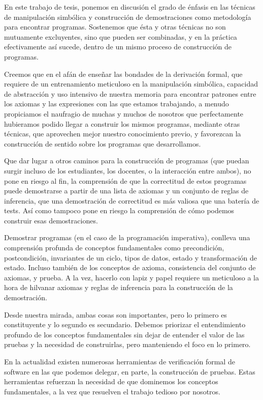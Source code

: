 \documentclass[12pt, a4paper, openany, fleqn]{book}
\begin{document}
    En este trabajo de tesis, ponemos en discusión el grado de énfasis en las técnicas de manipulación simbólica y construcción de demostraciones como metodología para encontrar programas. Sostenemos que ésta y otras técnicas no son mutuamente excluyentes, sino que pueden ser combinadas, y en la práctica efectivamente así sucede, dentro de un mismo proceso de construcción de programas.

    Creemos que en el afán de enseñar las bondades de la derivación formal, que requiere de un entrenamiento meticuloso en la manipulación simbólica, capacidad de abstracción y uso intensivo de nuestra memoria para encontrar patrones entre los axiomas y las expresiones con las que estamos trabajando, a menudo propiciamos el naufragio de muchas y muchos de nosotros que perfectamente hubieramos podido llegar a construir los mismos programas, mediante otras técnicas, que aprovechen mejor nuestro conocimiento previo, y favorezcan la construcción de sentido sobre los programas que desarrollamos.

    Que dar lugar a otros caminos para la construcción de programas (que puedan surgir incluso de los estudiantes, los docentes, o la interacción entre ambos), no pone en riesgo al fin, la comprensión de que la correctitud de estos programas puede demostrarse a partir de una lista de axiomas y un conjunto de reglas de inferencia, que una demostración de correctitud es más valiosa que una batería de tests. Así como tampoco pone en riesgo la comprensión de cómo podemos construir esas demostraciones.

    Demostrar programas (en el caso de la programación imperativa), conlleva una comprensión profunda de conceptos fundamentales como precondición, postcondición, invariantes de un ciclo, tipos de datos, estado y transformación de estado. Incluso también de los conceptos de axioma, consistencia del conjunto de axiomas, y prueba.
    A la vez, hacerlo con lapiz y papel requiere un meticuloso a la hora de hilvanar axiomas y reglas de inferencia para la construcción de la demostración.

    Desde nuestra mirada, ambas cosas son importantes, pero lo primero es constituyente y lo segundo es secundario. Debemos priorizar el entendimiento profundo de los conceptos fundamentales sin dejar de entender el valor de las pruebas y la necesidad de construirlas, pero manteniendo el foco en lo primero.

    En la actualidad existen numerosas herramientas de verificación formal de software en las que podemos delegar, en parte, la construcción de pruebas. Estas herramientas refuerzan la necesidad de que dominemos los conceptos fundamentales, a la vez que resuelven el trabajo tedioso por nosotros.
\end{document}
